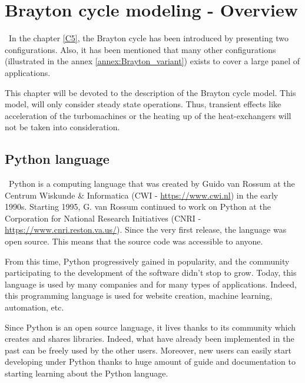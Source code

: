 \graphicspath{{Chapitre_6/Images/}}
\chapter{Brayton cycle modeling - Overview}\label{C6}
\quad\, In the chapter \ref{C5}, the Brayton cycle has been introduced by presenting two configurations. Also, it has been mentioned that many other configurations (illustrated in the annex \ref{annex:Brayton_variant}) exists to cover a large panel of applications. 

This chapter will be devoted to the description of the  Brayton cycle model. This model, will only consider steady state operations. Thus, transient effects like acceleration of the turbomachines or the heating up of the heat-exchangers will not be taken into consideration.
 

\section{Python language}
\quad\, Python is a computing language that was created by Guido van Rossum at the Centrum Wiskunde \& Informatica (CWI - \url{https://www.cwi.nl}) in the early 1990s. Starting 1995, G. van Rossum continued to work on Python at the Corporation for National Research Initiatives (CNRI - \url{https://www.cnri.reston.va.us/}). Since the very first release, the language was open source. This means that the source code was accessible to anyone. 

From this time, Python progressively gained in popularity, and the community participating to the development of the software didn't stop to grow. Today, this language is used by many companies and for many types of applications. Indeed, this programming language is used for website creation, machine learning, automation, etc. 

Since Python is an open source language, it lives thanks to its community which creates and shares libraries. Indeed, what have already been implemented in the past can be freely used by the other users. Moreover, new users can easily start developing under Python thanks to huge amount of guide and documentation to starting learning about the Python language.

